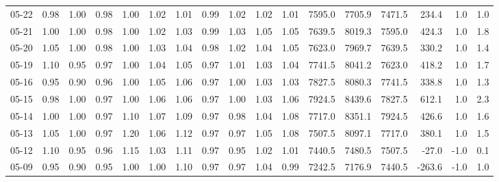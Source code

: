 \begin{threeparttable}
{\begin{tabular}{lrrrrrrrrrrrrrrrr}
  05-22 &   0.98 &   1.00 &         0.98 &     1.00 &           1.02 &        1.01 &        0.99 &        1.02 &          1.02 &          1.01 & 7595.0 & 7705.9 & 7471.5 &      234.4 &                      1.0 &                 1.0 \\
  05-21 &   1.00 &   1.00 &         0.98 &     1.00 &           1.02 &        1.03 &        0.99 &        1.03 &          1.05 &          1.05 & 7639.5 & 8019.3 & 7595.0 &      424.3 &                      1.0 &                 1.8 \\
  05-20 &   1.05 &   1.00 &         0.98 &     1.00 &           1.03 &        1.04 &        0.98 &        1.02 &          1.04 &          1.05 & 7623.0 & 7969.7 & 7639.5 &      330.2 &                      1.0 &                 1.4 \\
  05-19 &   1.10 &   0.95 &         0.97 &     1.00 &           1.04 &        1.05 &        0.97 &        1.01 &          1.03 &          1.04 & 7741.5 & 8041.2 & 7623.0 &      418.2 &                      1.0 &                 1.7 \\
  05-16 &   0.95 &   0.90 &         0.96 &     1.00 &           1.05 &        1.06 &        0.97 &        1.00 &          1.03 &          1.03 & 7827.5 & 8080.3 & 7741.5 &      338.8 &                      1.0 &                 1.3 \\
  05-15 &   0.98 &   1.00 &         0.97 &     1.00 &           1.06 &        1.06 &        0.97 &        1.00 &          1.03 &          1.06 & 7924.5 & 8439.6 & 7827.5 &      612.1 &                      1.0 &                 2.3 \\
  05-14 &   1.00 &   1.00 &         0.97 &     1.10 &           1.07 &        1.09 &        0.97 &        0.98 &          1.04 &          1.08 & 7717.0 & 8351.1 & 7924.5 &      426.6 &                      1.0 &                 1.6 \\
  05-13 &   1.05 &   1.00 &         0.97 &     1.20 &           1.06 &        1.12 &        0.97 &        0.97 &          1.05 &          1.08 & 7507.5 & 8097.1 & 7717.0 &      380.1 &                      1.0 &                 1.5 \\
  05-12 &   1.10 &   0.95 &         0.96 &     1.15 &           1.03 &        1.11 &        0.97 &        0.95 &          1.02 &          1.01 & 7440.5 & 7480.5 & 7507.5 &      -27.0 &                     -1.0 &                 0.1 \\
  05-09 &   0.95 &   0.90 &         0.95 &     1.00 &           1.00 &        1.10 &        0.97 &        0.97 &          1.04 &          0.99 & 7242.5 & 7176.9 & 7440.5 &     -263.6 &                     -1.0 &                 1.0 \\

\end{tabular}}
\end{threeparttable}
